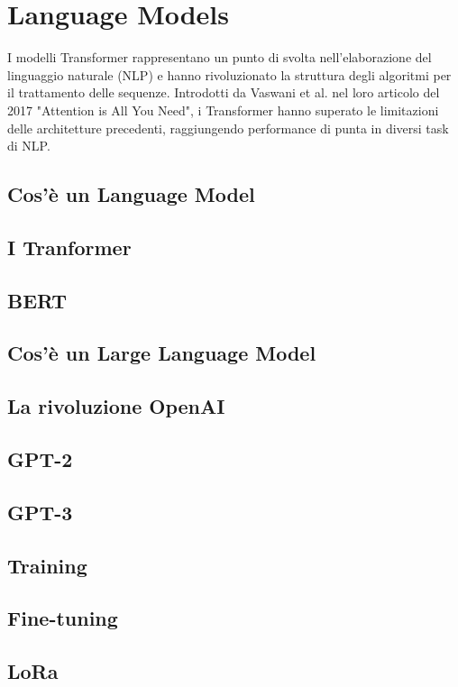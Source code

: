 \chapter{Language Models}\label{Language_Models}
I modelli Transformer rappresentano un punto di svolta nell'elaborazione del linguaggio naturale (NLP) e hanno rivoluzionato la struttura degli algoritmi per il trattamento delle sequenze. Introdotti da Vaswani et al. nel loro articolo del 2017 "Attention is All You Need", i Transformer hanno superato le limitazioni delle architetture precedenti, raggiungendo performance di punta in diversi task di NLP.
\section{Cos'è un Language Model}

\section{I Tranformer}

\section{BERT}

\section{Cos'è un Large Language Model}

\section{La rivoluzione OpenAI}

\section{GPT-2}

\section{GPT-3}

\section{Training}

\section{Fine-tuning}

\section{LoRa}
